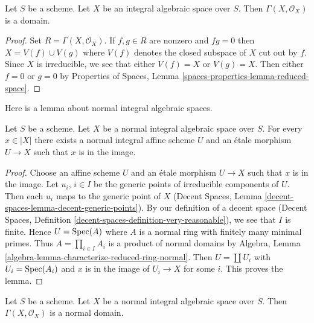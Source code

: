 \begin{lemma}
\label{lemma-integral-sections}
Let $S$ be a scheme. Let $X$ be an integral algebraic space over $S$.
Then $\Gamma(X, \mathcal{O}_X)$ is a domain.
\end{lemma}

\begin{proof}
Set $R = \Gamma(X, \mathcal{O}_X)$. If $f, g \in R$ are nonzero and
$fg = 0$ then $X = V(f) \cup V(g)$ where $V(f)$ denotes the closed subspace
of $X$ cut out by $f$. Since $X$ is irreducible, we see that either
$V(f) = X$ or $V(g) = X$. Then either $f = 0$ or $g = 0$ by
Properties of Spaces, Lemma \ref{spaces-properties-lemma-reduced-space}.
\end{proof}

\noindent
Here is a lemma about normal integral algebraic spaces.

\begin{lemma}
\label{lemma-normal-integral-cover-by-affines}
Let $S$ be a scheme. Let $X$ be a normal integral algebraic space over $S$.
For every $x \in |X|$ there exists a normal integral affine scheme $U$
and an \'etale morphism $U \to X$ such that $x$ is in the image.
\end{lemma}

\begin{proof}
Choose an affine scheme $U$ and an \'etale morphism $U \to X$ such that
$x$ is in the image. Let $u_i$, $i \in I$ be the generic points of irreducible
components of $U$. Then each $u_i$ maps to the generic point of $X$
(Decent Spaces, Lemma \ref{decent-spaces-lemma-decent-generic-points}). By 
our definition of a decent space
(Decent Spaces, Definition \ref{decent-spaces-definition-very-reasonable}),
we see that $I$ is finite. Hence $U = \mathop{\mathrm{Spec}}(A)$ where $A$ is a normal ring
with finitely many minimal primes.
Thus $A = \prod_{i \in I} A_i$ is a product of normal domains by
Algebra, Lemma \ref{algebra-lemma-characterize-reduced-ring-normal}.
Then $U = \coprod U_i$ with $U_i = \mathop{\mathrm{Spec}}(A_i)$ and $x$ is in the image of
$U_i \to X$ for some $i$. This proves the lemma.
\end{proof}

\begin{lemma}
\label{lemma-normal-integral-sections}
Let $S$ be a scheme. Let $X$ be a normal integral algebraic space over $S$.
Then $\Gamma(X, \mathcal{O}_X)$ is a normal domain.
\end{lemma}

